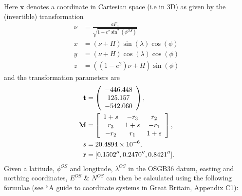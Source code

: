 \documentclass[letterpaper,10pt,english]{sphinxmanual}
\begin{document}
\sphinxAtStartPar
Here \(\mathbf{x}\) denotes a coordinate in Cartesian space (i.e in 3D)
as given by the (invertible) transformation
\begin{equation*}
\begin{split}\nu &= \frac{aF_0}{\sqrt{1-e^2\sin^2(\phi^{OS})}} \\
x &= (\nu+H) \sin(\lambda)\cos(\phi) \\
y &= (\nu+H) \cos(\lambda)\cos(\phi) \\
z &= ((1-e^2)\nu+H)\sin(\phi)\end{split}
\end{equation*}
\sphinxAtStartPar
and the transformation parameters are
\begin{eqnarray*}
\mathbf{t} &= \left(\begin{array}{c}
-446.448\\ 125.157\\ -542.060
\end{array}\right),\\
\mathbf{M} &= \left[\begin{array}{ c c c }
1+s& -r_3& r_2\\
r_3 & 1+s & -r_1 \\
-r_2 & r_1 & 1+s
\end{array}\right], \\
s &= 20.4894\times 10^{-6}, \\
\mathbf{r} &= [0.1502'', 0.2470'', 0.8421''].
\end{eqnarray*}
\sphinxAtStartPar
Given a latitude, \(\phi^{OS}\) and longitude, \(\lambda^{OS}\) in the
OSGB36 datum, easting and northing coordinates, \(E^{OS}\) \& \(N^{OS}\)
can then be calculated using the following formulae (see “A guide to coordinate
systems in Great Britain, Appendix C1):
\end{document}
